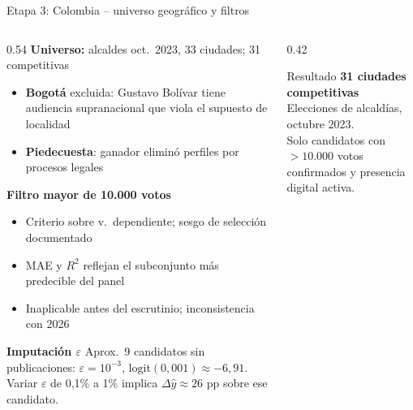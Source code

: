 \begin{frame}{Etapa 3: Colombia -- universo geográfico y filtros}
  \begin{columns}[T]
    \begin{column}{0.54\textwidth}
      {\small\textbf{Universo:} alcaldes oct.\ 2023, 33 ciudades; 31 competitivas}
      \begin{itemize}\scriptsize
        \item \textbf{Bogotá} excluida: Gustavo Bolívar tiene audiencia supranacional
              que viola el supuesto de localidad \corr{[1.12]}
        \item \textbf{Piedecuesta}: ganador eliminó perfiles por procesos legales
      \end{itemize}
      \vspace{0.2em}
      {\small\textbf{Filtro mayor de 10.000 votos}} \corr{[1.12]}
      \begin{itemize}\scriptsize
        \item Criterio sobre v.\ dependiente; sesgo de selección documentado
        \item MAE y $R^2$ reflejan el subconjunto más predecible del panel
        \item Inaplicable antes del escrutinio; inconsistencia con 2026
      \end{itemize}
      \vspace{0.2em}
      {\small\textbf{Imputación $\varepsilon$}} \corr{[1.13]}
      {\scriptsize Aprox.\ 9 candidatos sin publicaciones:
      $\varepsilon{=}10^{-3}$, $\text{logit}(0{,}001){\approx}{-}6{,}91$.
      Variar $\varepsilon$ de 0,1\% a 1\% implica $\Delta\hat{y}{\approx}26$ pp
      sobre ese candidato.}
    \end{column}
    \begin{column}{0.42\textwidth}
      \begin{exampleblock}{Resultado}
        \small \textbf{31 ciudades competitivas}\\[0.4em]
        \scriptsize Elecciones de alcaldías, octubre 2023.\\[0.2em]
        Solo candidatos con $>10.000$ votos confirmados y presencia digital activa.
      \end{exampleblock}
    \end{column}
  \end{columns}
\end{frame}

\addtocounter{framenumber}{1}

